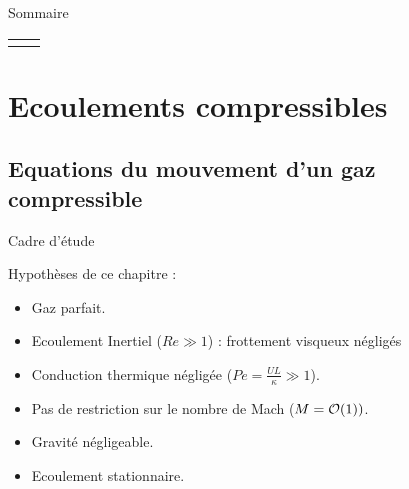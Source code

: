 
\begin{frame}{Sommaire}

\small
  
\hspace*{2mm}
\begin{tabular}{cc}
  		\begin{minipage}{62mm}
  			\tableofcontents[firstsection=-9]
      \vspace{15mm}
  		\end{minipage}
  		&   
  		\begin{minipage}{60cm}
		  \vspace*{-5mm}  
  		\end{minipage}
  	\end{tabular}

\vspace{0mm}

\end{frame}

\section{\bfseries Ecoulements compressibles}


\subsection{Equations du mouvement d'un gaz compressible}

\begin{frame}{Cadre d'étude}

\small
Hypothèses de ce chapitre :  
\begin{itemize}
\item<1> Gaz parfait.
\item Ecoulement Inertiel ($Re \gg 1$) : frottement visqueux négligés 
\item Conduction thermique négligée ($Pe = \frac{U L}{\kappa} \gg 1$).
\item Pas de restriction sur le nombre de Mach ($M = {\cal O}(1) ) $.
\item Gravité négligeable.
\item Ecoulement stationnaire.  
\end{itemize}

\end{frame}

